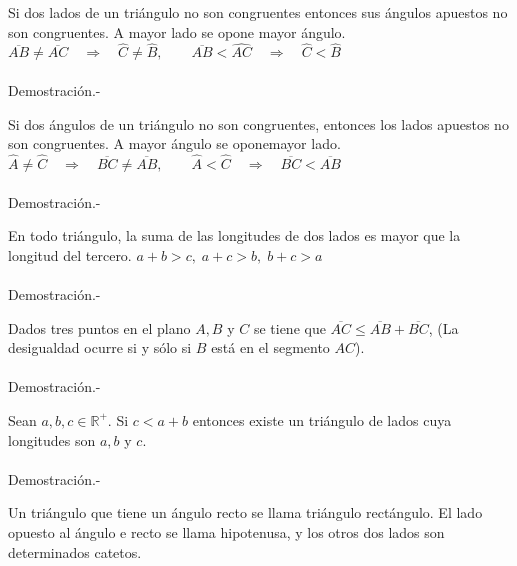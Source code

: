     \begin{proposicion}
	Si dos lados de un triángulo no son congruentes entonces sus ángulos apuestos no son congruentes. A mayor lado se opone mayor ángulo. $\overline{AB} \neq \overline{AC} \quad \Rightarrow \quad \widehat{C}\neq \widehat{B}, \qquad \overline{AB}<\widehat{AC} \quad \Rightarrow \quad \widehat{C}<\widehat{B}$\\\\
	    Demostración.-\;
    \end{proposicion}

    \begin{proposicion}
	Si dos ángulos de un triángulo no son congruentes, entonces los lados apuestos no son congruentes. A mayor ángulo se oponemayor lado. $\widehat{A}\neq \widehat{C} \quad \Rightarrow \quad \overline{BC}\neq \overline{AB}, \qquad \widehat{A}<\widehat{C} \quad \Rightarrow \quad \overline{BC} < \overline{AB}$\\\\
	    Demostración.-\;
    \end{proposicion}

    \begin{teo}
	En todo triángulo, la suma de las longitudes de dos lados es mayor que la longitud del tercero. $a+b>c, \; a+c>b, \; b+c>a $\\\\
	    Demostración.-\;
    \end{teo}

    \begin{teo}
	Dados tres puntos en el plano $A,B$ y $C$ se tiene que $\overline{AC} \leq \overline{AB}+\overline{BC}$, (La desigualdad ocurre si y sólo si $B$ está en el segmento $AC$).\\\\	
	    Demostración.-\;
    \end{teo}

    \begin{proposicion}
	Sean $a,b,c \in \mathbb{R}^{+}.$ Si $c<a+b$ entonces existe un triángulo de lados cuya longitudes son $a,b$ y $c$.\\\\
	    Demostración.-\;
    \end{proposicion}

\begin{def.}
    Un triángulo que tiene un ángulo recto se llama triángulo rectángulo. El lado opuesto al ángulo e recto se llama hipotenusa, y los otros dos lados son determinados catetos.
\end{def.}

